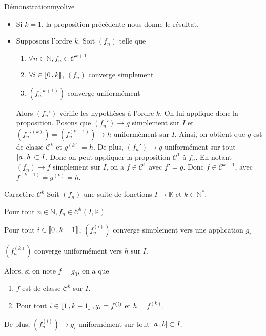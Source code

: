     \begin{demo}{Démonstration}{myolive}
        \begin{itemize}
            \item Si $k=1$, la proposition précédente nous donne le résultat.
            \item Supposons l’ordre $k$. Soit $(f_n)$ telle que 
            \begin{enumerate}[label=\textit{(\alph*)}]
                \item $\forall n \in \mathbb{N}, f_n \in \mathcal{C}^{k+1}$
                \item $\forall i \in \left\llbracket 0 \, , k \right\rrbracket$, $(f_n)$ converge simplement 
                \item $\left(f_n^{(k+1)}\right)$ converge uniformément 
            \end{enumerate}
            Alors $(f_n')$ vérifie les hypothèses à l’ordre $k$. On lui applique donc la proposition. Posons que $(f_n') \rightarrow g$ simplement sur $I$ et $\left(f_n'^{(k)}\right) = \left(f_n^{(k+1)}\right) \rightarrow h$ uniformément sur $I$. Ainsi, on obtient que $g$ est de classe $\mathcal{C}^k$  et $g^{(k)} = h$. De plus, $(f_n') \rightarrow g$ uniformément sur tout $\left[ a \, , b \right] \subset I$. Donc on peut appliquer la proposition $\mathcal{C}^1$ à $f_n$. En notant $(f_n) \rightarrow f$ simplement sur $I$, on a $f \in \mathcal{C}^1$ avec $f' = g$. Donc $f \in \mathcal{C}^{k+1}$, avec $f^{(k+1)} = g^{(k)} = h$.
        \end{itemize}
    \end{demo}

    \begin{prop}{Caractère $\mathcal{C}^k$}{}
        Soit $(f_n)$ une suite de fonctions $I \rightarrow \mathbb{K}$ et $k \in \mathbb{N}^*$. 
        \begin{suppose}
            \item Pour tout $n \in \mathbb{N}, f_n \in \mathcal{C}^k(I,\mathbb{K})$
            \item Pour tout $i \in \left\llbracket 0 \, , k-1 \right\rrbracket$, $\left(f_n^{(i)}\right)$ converge simplement vers une application $g_i$
            \item $\left(f_n^{(k)}\right)$ converge uniformément vers $h$ sur $I$.
        \end{suppose}
        Alors, si on note $f = g_0$, on a que \begin{enumerate}
            \item $f$ est de classe $\mathcal{C}^k$ sur $I$.
            \item Pour tout $i \in \left\llbracket 1 \, , k-1 \right\rrbracket, g_i = f^{(i)}$ et $h = f^{(k)}$. 
        \end{enumerate}
        De plus, $\left(f_n^{(i)}\right) \rightarrow g_i$ uniformément sur tout $\left[ a \, , b \right] \subset I$.
    \end{prop}


